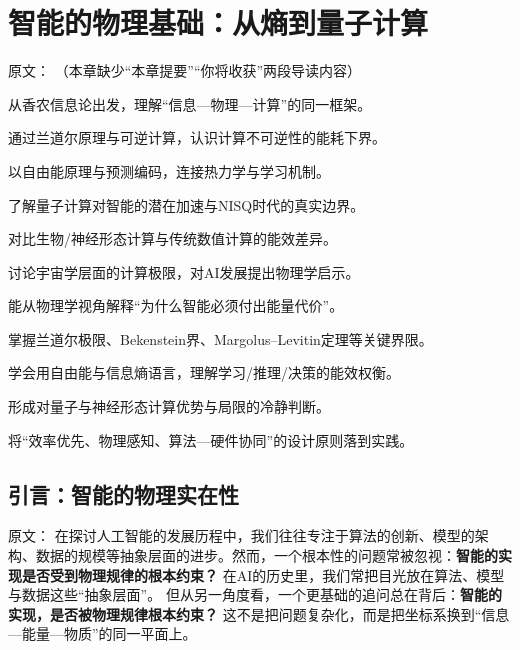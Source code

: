\chapter{智能的物理基础：从熵到量子计算}

原文：
（本章缺少“本章提要”“你将收获”两段导读内容）
\begin{introduction}[本章提要]
  \item 从香农信息论出发，理解“信息—物理—计算”的同一框架。
  \item 通过兰道尔原理与可逆计算，认识计算不可逆性的能耗下界。
  \item 以自由能原理与预测编码，连接热力学与学习机制。
  \item 了解量子计算对智能的潜在加速与NISQ时代的真实边界。
  \item 对比生物/神经形态计算与传统数值计算的能效差异。
  \item 讨论宇宙学层面的计算极限，对AI发展提出物理学启示。
\end{introduction}

\begin{introduction}[你将收获]
  \item 能从物理学视角解释“为什么智能必须付出能量代价”。
  \item 掌握兰道尔极限、Bekenstein界、Margolus--Levitin定理等关键界限。
  \item 学会用自由能与信息熵语言，理解学习/推理/决策的能效权衡。
  \item 形成对量子与神经形态计算优势与局限的冷静判断。
  \item 将“效率优先、物理感知、算法—硬件协同”的设计原则落到实践。
\end{introduction}

\section{引言：智能的物理实在性}

原文：
在探讨人工智能的发展历程中，我们往往专注于算法的创新、模型的架构、数据的规模等抽象层面的进步。然而，一个根本性的问题常被忽视：\textbf{智能的实现是否受到物理规律的根本约束？}
在AI的历史里，我们常把目光放在算法、模型与数据这些“抽象层面”。  
但从另一角度看，一个更基础的追问总在背后：\textbf{智能的实现，是否被物理规律根本约束？}  
这不是把问题复杂化，而是把坐标系换到“信息—能量—物质”的同一平面上。

